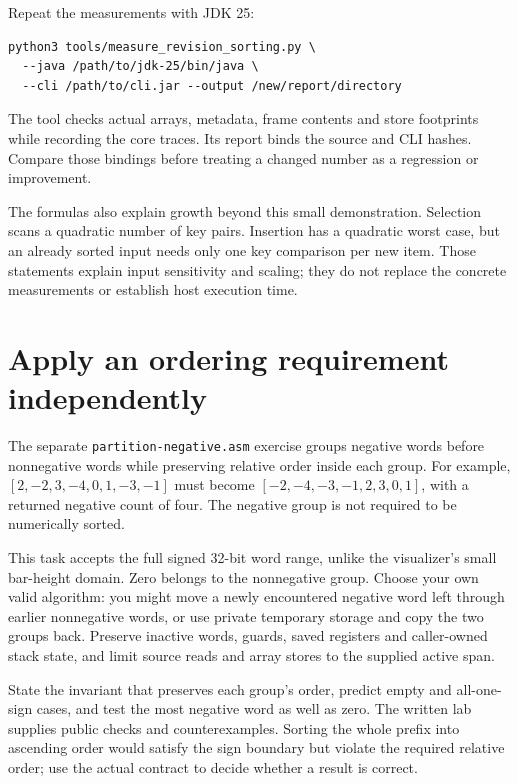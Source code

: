 Repeat the measurements with JDK 25:
\begin{verbatim}
python3 tools/measure_revision_sorting.py \
  --java /path/to/jdk-25/bin/java \
  --cli /path/to/cli.jar --output /new/report/directory
\end{verbatim}
The tool checks actual arrays, metadata, frame contents and store footprints while
recording the core traces. Its report binds the source and CLI hashes. Compare
those bindings before treating a changed number as a regression or improvement.

The formulas also explain growth beyond this small demonstration. Selection scans
a quadratic number of key pairs. Insertion has a quadratic worst case, but an
already sorted input needs only one key comparison per new item. Those statements
explain input sensitivity and scaling; they do not replace the concrete measurements
or establish host execution time.

\section{Apply an ordering requirement independently}

The separate \texttt{partition-negative.asm} exercise groups negative words before
nonnegative words while preserving relative order inside each group. For example,
$[2,-2,3,-4,0,1,-3,-1]$ must become
$[-2,-4,-3,-1,2,3,0,1]$, with a returned negative count of four. The negative group
is not required to be numerically sorted.

This task accepts the full signed 32-bit word range, unlike the visualizer's small
bar-height domain. Zero belongs to the nonnegative group. Choose your own valid
algorithm: you might move a newly encountered negative word left through earlier
nonnegative words, or use private temporary storage and copy the two groups back.
Preserve inactive words, guards, saved registers and caller-owned stack state,
and limit source reads and array stores to the supplied active span.

State the invariant that preserves each group's order, predict empty and all-one-sign
cases, and test the most negative word as well as zero. The written lab supplies
public checks and counterexamples. Sorting the whole prefix into ascending order
would satisfy the sign boundary but violate the required relative order; use the
actual contract to decide whether a result is correct.
